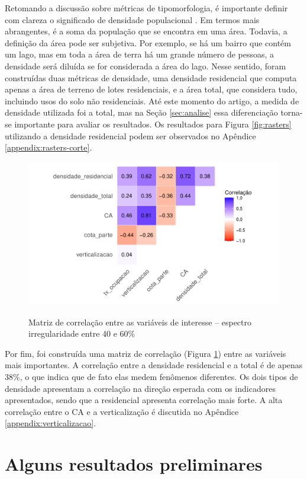 Retomando a discussão sobre métricas de tipomorfologia, é importante definir com clareza o significado de densidade populacional \cite{ccalicskan2022morphological}. Em termos mais abrangentes, é a soma da população que se encontra em uma área. Todavia, a definição da área pode ser subjetiva. Por exemplo, se há um bairro que contém um lago, mas em toda a área de terra há um grande número de pessoas, a densidade será diluída se for considerada a área do lago. Nesse sentido, foram construídas duas métricas de densidade, uma densidade residencial que computa apenas a área de terreno de lotes residenciais, e a área total, que considera tudo, incluindo usos do solo não residenciais. Até este momento do artigo, a medida de densidade utilizada foi a total, mas na Seção \ref{sec:analise} essa diferenciação torna-se importante para avaliar os resultados. Os resultados para Figura \ref{fig:rasters} utilizando a densidade residencial podem ser observados no Apêndice \ref{appendix:rasters-corte}.

\begin{figure}[!h]
    \centering
    \caption{Matriz de correlação entre as variáveis de interesse -- espectro irregularidade entre 40 e 60\%}
    \includegraphics[width = .75\textwidth]{imagens/corrplot.pdf}
    \label{fig:corplot}
\end{figure}

Por fim, foi construída uma matriz de correlação (Figura \ref{fig:corplot}) entre as variáveis mais importantes. A correlação entre a densidade residencial e a total é de apenas 38\%, o que indica que de fato elas medem fenômenos diferentes. Os dois tipos de densidade apresentam a correlação na direção esperada com os indicadores apresentados, sendo que a residencial apresenta correlação mais forte. A alta correlação entre o CA e a verticalização é discutida no Apêndice \ref{appendix:verticalizacao}.

\section{Alguns resultados preliminares}

